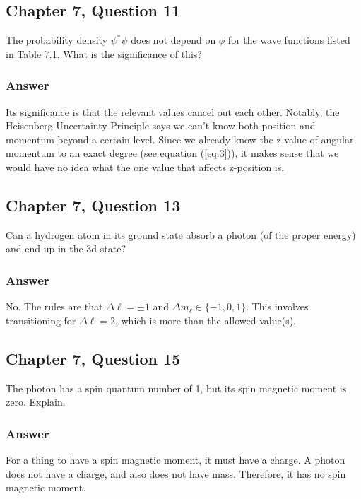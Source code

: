 \documentclass[12pt]{article}
\begin{document}
        \subsection{Chapter 7, Question 11}
            The probability density $\psi^* \psi$ does not depend on $\phi$ for the wave functions listed in Table 7.1. 
            What is the signiﬁcance of this?

            \subsubsection{Answer}
                Its significance is that the relevant values cancel out each other.
                Notably, the Heisenberg Uncertainty Principle says we can't know both position and momentum beyond a certain level.
                Since we already know the z-value of angular momentum to an exact degree (see equation (\ref{eq:3})), it makes sense that we would have no idea what the one value that affects z-position is.
            
        \subsection{Chapter 7, Question 13}
            Can a hydrogen atom in its ground state absorb a photon (of the proper energy) and end up in the 3d state?

            \subsubsection{Answer}
                No. 
                The rules are that $\Delta \ell = \pm 1$ and $\Delta m_\ell \in \{-1, 0, 1\}$.
                This involves transitioning for $\Delta \ell = 2$, which is more than the allowed value(s).
            
        \subsection{Chapter 7, Question 15}
            The photon has a spin quantum number of 1, but its spin magnetic moment is zero. 
            Explain.

            \subsubsection{Answer}
                For a thing to have a spin magnetic moment, it must have a charge.
                A photon does not have a charge, and also does not have mass.
                Therefore, it has no spin magnetic moment.
            
\end{document}
